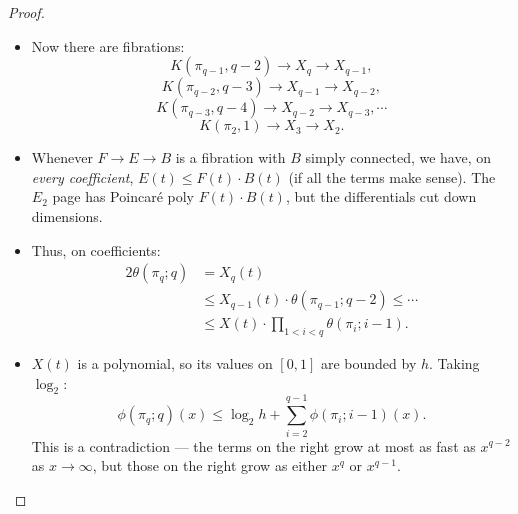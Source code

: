 \documentclass[11pt]{article}
\begin{document}
\begin{SerreCohModTwoEilMacLane}
\begin{proof}
\begin{itemize}
\item %
Now there are fibrations:
\[K(\pi_{q-1},q-2)\to X_{q}\to X_{q-1},\]
\[K(\pi_{q-2},q-3)\to X_{q-1}\to X_{q-2},\]
\[K(\pi_{q-3},q-4)\to X_{q-2}\to X_{q-3},\cdots\]
\[K(\pi_{2},1)\to X_{3}\to X_2.\]
\item Whenever $F\to E\to B$ is a fibration with $B$ simply connected, we have, on \emph{every coefficient}, $E(t)\leq F(t)\cdot B(t)$ (if all the terms make sense). The $E_2$ page has Poincar\'e poly $F(t)\cdot B(t)$, but the differentials cut down dimensions.
\item Thus, on coefficients:
\begin{alignat*}{2}
\theta(\pi_q;q)&= X_q(t)\\
&\leq X_{q-1}(t)\cdot\theta(\pi_{q-1};q-2)\leq\cdots\\
&\leq X(t)\cdot \prod_{1<i<q}\theta(\pi_i;i-1).
\end{alignat*}
\item $X(t)$ is a polynomial, so its values on $[0,1]$ are bounded by $h$. Taking $\log_2$:
\[\phi(\pi_q;q)(x)\leq\log_2h+ \sum_{i=2}^{q-1}\phi(\pi_i;i-1)(x).\]
This is a contradiction --- the terms on the right grow at most as fast as $x^{q-2}$ as $x\to\infty$, but those on the right grow as either $x^q$ or $x^{q-1}$.\qedhere
\end{itemize}
\end{proof}

\pagebreak
\end{SerreCohModTwoEilMacLane}
\end{document}
